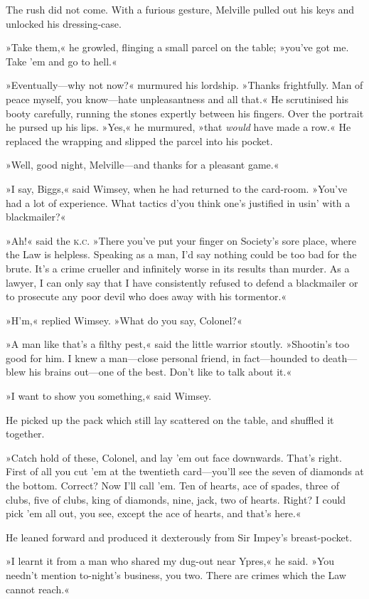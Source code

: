 The rush did not come. With a furious gesture, Melville pulled out his keys and unlocked his dressing-case.

»Take them,« he growled, flinging a small parcel on the table; »you've got me. Take 'em and go to hell.«

»Eventually—why not now?« murmured his lordship. »Thanks frightfully. Man of peace myself, you know—hate unpleasantness and all that.« He scrutinised his booty carefully, running the stones expertly between his fingers. Over the portrait he pursed up his lips. »Yes,« he murmured, »that \textit{would} have made a row.« He replaced the wrapping and slipped the parcel into his pocket.

»Well, good night, Melville—and thanks for a pleasant game.«

»I say, Biggs,« said Wimsey, when he had returned to the card-room. »You've had a lot of experience. What tactics d'you think one's justified in usin' with a blackmailer?«

»Ah!« said the \textsc{k.c.} »There you've put your finger on Society's sore place, where the Law is helpless. Speaking as a man, I'd say nothing could be too bad for the brute. It's a crime crueller and infinitely worse in its results than murder. As a lawyer, I can only say that I have consistently refused to defend a blackmailer or to prosecute any poor devil who does away with his tormentor.«

»H'm,« replied Wimsey. »What do you say, Colonel?«

»A man like that's a filthy pest,« said the little warrior stoutly. »Shootin's too good for him. I knew a man—close personal friend, in fact—hounded to death—blew his brains out—one of the best. Don't like to talk about it.«

»I want to show you something,« said Wimsey.

He picked up the pack which still lay scattered on the table, and shuffled it together.

»Catch hold of these, Colonel, and lay 'em out face downwards. That's right. First of all you cut 'em at the twentieth card—you'll see the seven of diamonds at the bottom. Correct? Now I'll call 'em. Ten of hearts, ace of spades, three of clubs, five of clubs, king of diamonds, nine, jack, two of hearts. Right? I could pick 'em all out, you see, except the ace of hearts, and that's here.«

He leaned forward and produced it dexterously from Sir Impey's breast-pocket.

»I learnt it from a man who shared my dug-out near Ypres,« he said. »You needn't mention to-night's business, you two. There are crimes which the Law cannot reach.«